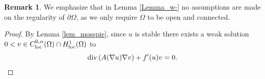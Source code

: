 \documentclass[10 pt,a4paper]{article}
\theoremstyle{definition}
\newtheorem{remark}[definition]{Remark}
\begin{document}
\begin{remark}
		We emphasize that in Lemma \ref{Lemma_w-} no assumptions are made on the regularity of $\partial\Omega$, as we only require $\Omega$ to be open and connected.
\end{remark}

\begin{proof}
By Lemma \ref{lem_mosspie}, since $u$ is stable there exists a weak solution $0 < v \in C^{0,\alpha}_{\mathrm{loc}}(\Omega) \cap H^1_{\mathrm{loc}}(\Omega)$ to
\[
		\mathrm{div} \left( A(\nabla u)\nabla v\right) + f'(u)v = 0.
\]


\end{proof}
\end{document}
